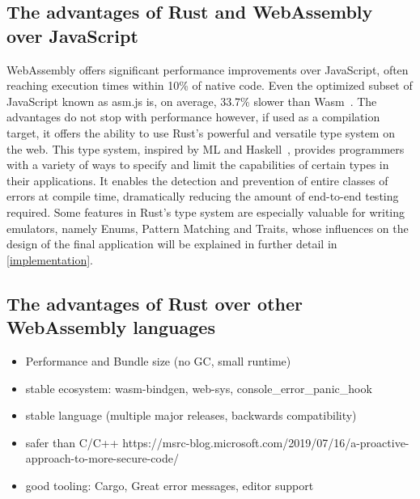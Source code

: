 \subsection{The advantages of Rust and WebAssembly over JavaScript}

WebAssembly offers significant performance improvements over JavaScript, often reaching execution times within 10\% of native code. Even the optimized subset of JavaScript known as asm.js is, on average, 33.7\% slower than Wasm~\cite[Chapter~7.3]{wasmspeed}. The advantages do not stop with performance however, if used as a compilation target, it offers the ability to use Rust's powerful and versatile type system on the web.
This type system, inspired by ML and Haskell~\cite{rustinfluences}, provides programmers with a variety of ways to specify and limit the capabilities of certain types in their applications.
It enables the detection and prevention of entire classes of errors at compile time, dramatically reducing the amount of end-to-end testing required.
Some features in Rust's type system are especially valuable for writing emulators, namely Enums, Pattern Matching and Traits, whose influences on the design of the final application will be explained in further detail in \cref{implementation}.


\subsection{The advantages of Rust over other WebAssembly languages}

\begin{itemize}
  \item Performance and Bundle size (no GC, small runtime)
  \item stable ecosystem: wasm-bindgen, web-sys, console\_error\_panic\_hook
  \item stable language (multiple major releases, backwards compatibility)
  \item safer than C/C++ https://msrc-blog.microsoft.com/2019/07/16/a-proactive-approach-to-more-secure-code/
  \item good tooling: Cargo, Great error messages, editor support
\end{itemize}


